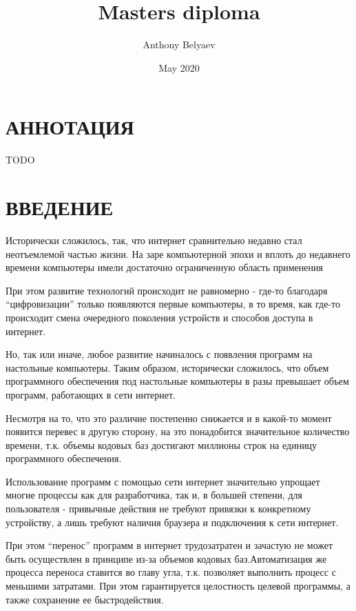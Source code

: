 \documentclass[a4paper,14pt]{extreport} %
\title{Masters diploma}
\date{May 2020}
\author{Anthony Belyaev}
\begin{document}
    \newpage
    {
        \section*{АННОТАЦИЯ}
    }


    TODO





    \newpage
    {
      \tableofcontents
      \clearpage
    }



    {\section*{ВВЕДЕНИЕ}}


Исторически сложилось, так, что интернет сравнительно недавно
стал неотъемлемой частью жизни. На заре компьютерной эпохи и вплоть до недавнего времени компьютеры имели достаточно ограниченную область применения

При этом развитие технологий происходит не равномерно - где-то
благодаря “цифровизации” только появляются первые компьютеры, в то время, как где-то происходит смена очередного поколения устройств и способов доступа в интернет.

Но, так или иначе, любое развитие начиналось с появления
программ на настольные компьютеры. Таким образом, исторически
сложилось, что объем программного обеспечения под настольные
компьютеры в разы превышает объем программ, работающих в сети
интернет.

Несмотря на то, что это различие постепенно снижается и в
какой-то момент появится перевес в другую сторону, на это понадобится значительное количество времени, т.к. объемы кодовых баз достигают миллионы строк на единицу программного обеспечения.

Использование программ с помощью сети интернет значительно
упрощает многие процессы как для разработчика, так и, в большей степени, для пользователя - привычные действия не требуют привязки к конкретному устройству, а лишь требуют наличия браузера и подключения к сети интернет.

При этом “перенос” программ в интернет трудозатратен и зачастую не может быть осуществлен в принципе из-за объемов кодовых баз.Автоматизация же процесса переноса ставится во главу угла, т.к. позволяет выполнить процесс с меньшими затратами. При этом гарантируется целостность целевой программы, а также сохранение ее быстродействия.
\end{document}
